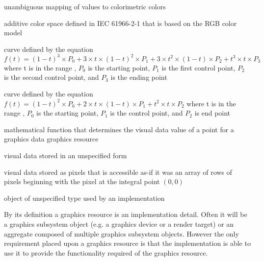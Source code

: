 %
unambiguous mapping of values to colorimetric colors

%
%
 additive color space defined in IEC 61966-2-1 that is based on the RGB color model

 curve defined by the 
equation $f(t) = (1 - t)^{3} \times P_{0} + 3 \times t \times (1 - t)^{2} 
\times P_{1} + 3 \times t^{2} \times (1 - t) \times P_{2} + t^{3} \times t 
\times P_{3}$ where t is in the range , $P_{0}$ is the starting point, $P_{1}$ 
is the first control point, $P_{2}$ is the second control point, and $P_{3}$ is 
the ending point

%
%
 curve defined by the 
equation $f(t) = (1 - t)^{2} \times P_{0} + 2 \times t \times (1 - t) 
\times P_{1} + t^{2} \times t \times P_{2}$ where t is in the range , $P_{0}$ is the starting point, $P_{1}$ is the 
control point, and $P_{2}$ is end point

%
mathematical function that determines the visual data value of a point for a graphics data graphics resource

%
 visual data stored in an unspecified form

%
%
 visual data stored as pixels that is accessible as-if it was an array of rows of pixels beginning with the pixel at the integral point $(0,0)$

%
 object of unspecified type used by an implementation
\begin{note}
By its definition a graphics resource is an implementation detail. Often it will be a graphics subsystem object (e.g. a graphics device or a render target) or an aggregate composed of multiple graphics subsystem objects. However the only requirement placed upon a graphics resource is that the implementation is able to use it to provide the functionality required of the graphics resource.
\end{note}


